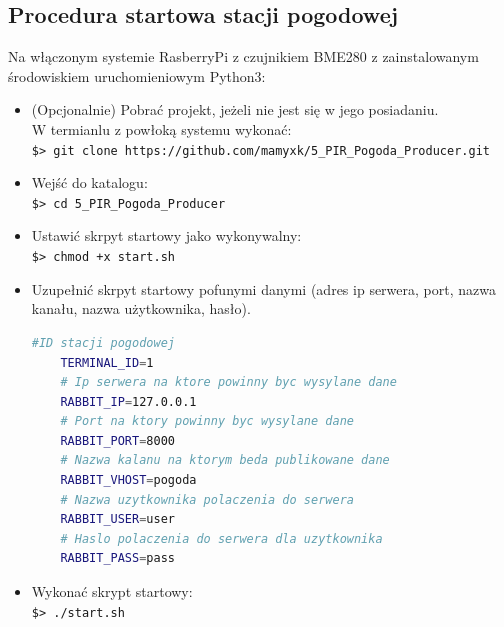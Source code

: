 \documentclass[12pt,a4paper]{article}
\begin{document}
    \pagebreak
    \subsection{Procedura startowa stacji pogodowej}
    Na włączonym systemie RasberryPi z czujnikiem BME280 z zainstalowanym środowiskiem uruchomieniowym Python3:
    \begin{itemize}
        \item (Opcjonalnie) Pobrać projekt, jeżeli nie jest się w jego posiadaniu. \\ W termianlu z powłoką systemu wykonać:\\ \texttt{\$> git clone https://github.com/mamyxk/5\_PIR\_Pogoda\_Producer.git}
        \item Wejść do katalogu: \\\texttt{\$> cd 5\_PIR\_Pogoda\_Producer}
        \item Ustawić skrpyt startowy jako wykonywalny:\\ \texttt{\$> chmod +x start.sh}
        \item Uzupełnić skrpyt startowy pofunymi danymi (adres ip serwera, port, nazwa kanału, nazwa użytkownika, hasło).\\\begin{lstlisting}[language=Bash]
    #ID stacji pogodowej
    TERMINAL_ID=1
    # Ip serwera na ktore powinny byc wysylane dane
    RABBIT_IP=127.0.0.1
    # Port na ktory powinny byc wysylane dane
    RABBIT_PORT=8000
    # Nazwa kalanu na ktorym beda publikowane dane
    RABBIT_VHOST=pogoda
    # Nazwa uzytkownika polaczenia do serwera
    RABBIT_USER=user
    # Haslo polaczenia do serwera dla uzytkownika
    RABBIT_PASS=pass
        \end{lstlisting}
        \item Wykonać skrypt startowy: \\ \texttt{\$> ./start.sh}
    \end{itemize}
\end{document}
